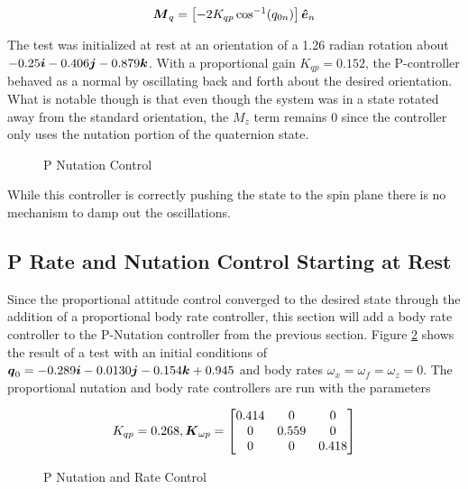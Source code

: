 \begin{equation}
  \boldsymbol{M}_{q} = \left[-2 K_{qp} \cos^{-1} (q_{0n}) \right] \boldsymbol{\hat{e}}_n
  \label{eqn:PNutationControl}
\end{equation}


The test was initialized at rest at an orientation of a 1.26 radian rotation about $-0.25 \boldsymbol{i} -0.406\boldsymbol{j} -0.879\boldsymbol{k}$.  With a proportional gain $K_{qp} = 0.152$, the P-controller behaved as a normal by oscillating back and forth about the desired orientation.  What is notable though is that even though the system was in a state rotated away from the standard orientation, the $M_z$ term remains 0 since the controller only uses the nutation portion of the quaternion state.

\begin{figure}[H]
  \centerline{}
  \caption{P Nutation Control}
  \label{fig:PNutationControl}
\end{figure}

While this controller is correctly pushing the state to the spin plane there is no mechanism to damp out the oscillations.

\subsection{P Rate and Nutation Control Starting at Rest}
\label{subsec:PRateNutationControlStartingatRest}

Since the proportional attitude control converged to the desired state through the addition of a proportional body rate controller, this section will add a body rate controller to the P-Nutation controller from the previous section.  Figure \ref{fig:PNutationRateControl} shows the result of a test with an initial conditions of $\boldsymbol{q}_0 = -0.289\boldsymbol{i} -0.0130 \boldsymbol{j} -0.154 \boldsymbol{k} + 0.945$ and body rates $\omega_x = \omega_f = \omega_z = 0$.  The proportional nutation and body rate controllers are run with the parameters

\begin{equation}
  K_{qp} = 0.268, \boldsymbol{K}_{\omega p} = \begin{bmatrix} 0.414 & 0 & 0 \\ 0 & 0.559 & 0 \\ 0 & 0 & 0.418 \end{bmatrix}
\end{equation}

\begin{figure}[H]
  \centerline{}
  \caption{P Nutation and Rate Control}
  \label{fig:PNutationRateControl}
\end{figure}

